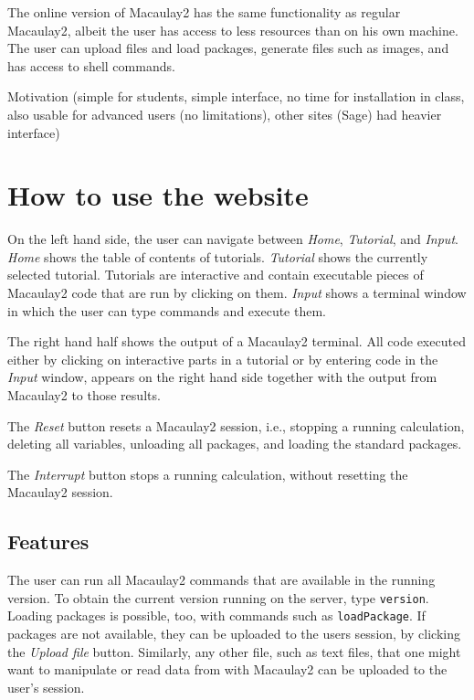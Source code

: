 \documentclass[]{article}
\begin{document}
The online version of Macaulay2 has the same functionality as regular Macaulay2, albeit the user has access to less resources than on his own machine. The user can upload files and load packages, generate files such as images, and has access to shell commands. 


Motivation (simple for students, simple interface, no time for installation in class, also usable for advanced users (no limitations), other sites (Sage) had heavier interface)


\section{How to use the website}
On the left hand side, the user can navigate between {\it Home}, {\it Tutorial}, and {\it Input}. {\it Home} shows the table of contents of tutorials. {\it Tutorial} shows the currently selected tutorial. Tutorials are interactive and contain executable pieces of Macaulay2 code that are run by clicking on them. {\it Input} shows a terminal window in which the user can type commands and execute them.  

The right hand half shows the output of a Macaulay2 terminal. All code executed either by clicking on interactive parts in a tutorial or by entering code in the {\it Input} window, appears on the right hand side together with the output from Macaulay2 to those results. 

The {\it Reset} button resets a Macaulay2 session, i.e., stopping a running calculation, deleting all variables, unloading all packages, and loading the standard packages. 

The {\it Interrupt} button stops a running calculation, without resetting the Macaulay2 session. 

\subsection{Features}
The user can run all Macaulay2 commands that are available in the running version. To obtain the current version running on the server, type {\tt version}. Loading packages is possible, too, with commands such as {\tt loadPackage}. If packages are not available, they can be uploaded to the users session, by clicking the {\it Upload file} button. Similarly, any other file, such as text files, that one might want to manipulate or read data from with Macaulay2 can be uploaded to the user's session. 
\end{document}
